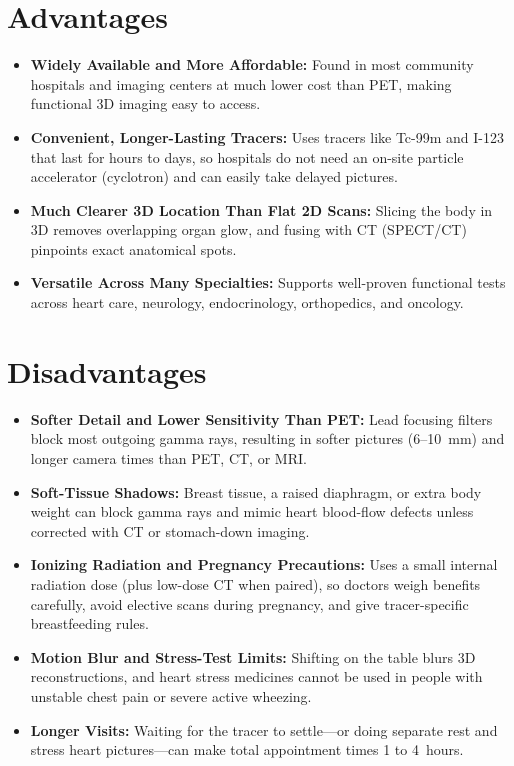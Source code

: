 \section{Advantages}

\begin{itemize}
    \item \textbf{Widely Available and More Affordable:} Found in most community hospitals and imaging centers at much lower cost than PET, making functional 3D imaging easy to access.
    \item \textbf{Convenient, Longer-Lasting Tracers:} Uses tracers like Tc-99m and I-123 that last for hours to days, so hospitals do not need an on-site particle accelerator (cyclotron) and can easily take delayed pictures.
    \item \textbf{Much Clearer 3D Location Than Flat 2D Scans:} Slicing the body in 3D removes overlapping organ glow, and fusing with CT (SPECT/CT) pinpoints exact anatomical spots.
    \item \textbf{Versatile Across Many Specialties:} Supports well-proven functional tests across heart care, neurology, endocrinology, orthopedics, and oncology.
\end{itemize}

\section{Disadvantages}

\begin{itemize}
    \item \textbf{Softer Detail and Lower Sensitivity Than PET:} Lead focusing filters block most outgoing gamma rays, resulting in softer pictures (6--10~mm) and longer camera times than PET, CT, or MRI.
    \item \textbf{Soft-Tissue Shadows:} Breast tissue, a raised diaphragm, or extra body weight can block gamma rays and mimic heart blood-flow defects unless corrected with CT or stomach-down imaging.
    \item \textbf{Ionizing Radiation and Pregnancy Precautions:} Uses a small internal radiation dose (plus low-dose CT when paired), so doctors weigh benefits carefully, avoid elective scans during pregnancy, and give tracer-specific breastfeeding rules.
    \item \textbf{Motion Blur and Stress-Test Limits:} Shifting on the table blurs 3D reconstructions, and heart stress medicines cannot be used in people with unstable chest pain or severe active wheezing.
    \item \textbf{Longer Visits:} Waiting for the tracer to settle---or doing separate rest and stress heart pictures---can make total appointment times 1 to 4~hours.
\end{itemize}

